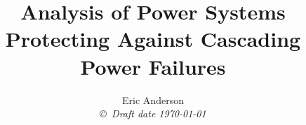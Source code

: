 

\title{ Analysis of Power Systems \\ \large{Protecting Against Cascading Power Failures} }

\author{Eric Anderson \\
{\small\em \copyright \  Draft date \today }}

 \date{ }

\maketitle

\pagestyle{headings}


\tableofcontents




\listoffigures
\listoftables




\pagestyle{plain}




%

%






\appendix
%

%
%
%
%

	
		




